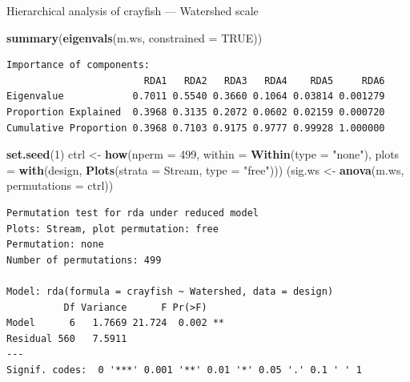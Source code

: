 \documentclass[10pt,ignorenonframetext,compress, aspectratio=169]{beamer}
\newenvironment{Shaded}{\begin{snugshade}}{\end{snugshade}}
\newcommand{\KeywordTok}[1]{\textcolor[rgb]{0.13,0.29,0.53}{\textbf{{#1}}}}
\newcommand{\DataTypeTok}[1]{\textcolor[rgb]{0.13,0.29,0.53}{{#1}}}
\newcommand{\DecValTok}[1]{\textcolor[rgb]{0.00,0.00,0.81}{{#1}}}
\newcommand{\StringTok}[1]{\textcolor[rgb]{0.31,0.60,0.02}{{#1}}}
\newcommand{\OtherTok}[1]{\textcolor[rgb]{0.56,0.35,0.01}{{#1}}}
\newcommand{\NormalTok}[1]{{#1}}
\begin{document}
\begin{frame}[fragile]{Hierarchical analysis of crayfish --- Watershed
scale}

\tiny

\begin{Shaded}
\begin{Highlighting}[]
\KeywordTok{summary}\NormalTok{(}\KeywordTok{eigenvals}\NormalTok{(m.ws, }\DataTypeTok{constrained =} \OtherTok{TRUE}\NormalTok{))}
\end{Highlighting}
\end{Shaded}

\begin{verbatim}
Importance of components:
                        RDA1   RDA2   RDA3   RDA4    RDA5     RDA6
Eigenvalue            0.7011 0.5540 0.3660 0.1064 0.03814 0.001279
Proportion Explained  0.3968 0.3135 0.2072 0.0602 0.02159 0.000720
Cumulative Proportion 0.3968 0.7103 0.9175 0.9777 0.99928 1.000000
\end{verbatim}

\begin{Shaded}
\begin{Highlighting}[]
\KeywordTok{set.seed}\NormalTok{(}\DecValTok{1}\NormalTok{)}
\NormalTok{ctrl <-}\StringTok{ }\KeywordTok{how}\NormalTok{(}\DataTypeTok{nperm =} \DecValTok{499}\NormalTok{, }\DataTypeTok{within =} \KeywordTok{Within}\NormalTok{(}\DataTypeTok{type =} \StringTok{"none"}\NormalTok{),}
            \DataTypeTok{plots =} \KeywordTok{with}\NormalTok{(design, }\KeywordTok{Plots}\NormalTok{(}\DataTypeTok{strata =} \NormalTok{Stream, }\DataTypeTok{type =} \StringTok{"free"}\NormalTok{)))}
\NormalTok{(sig.ws <-}\StringTok{ }\KeywordTok{anova}\NormalTok{(m.ws, }\DataTypeTok{permutations =} \NormalTok{ctrl))}
\end{Highlighting}
\end{Shaded}

\begin{verbatim}
Permutation test for rda under reduced model
Plots: Stream, plot permutation: free
Permutation: none
Number of permutations: 499

Model: rda(formula = crayfish ~ Watershed, data = design)
          Df Variance      F Pr(>F)   
Model      6   1.7669 21.724  0.002 **
Residual 560   7.5911                 
---
Signif. codes:  0 '***' 0.001 '**' 0.01 '*' 0.05 '.' 0.1 ' ' 1
\end{verbatim}

\normalsize

\end{frame}
\end{document}
